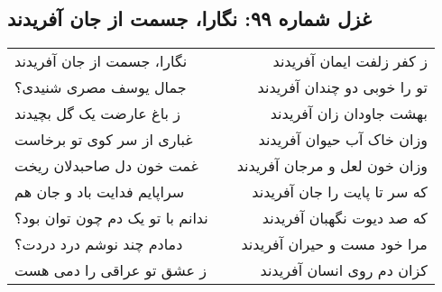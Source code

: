 \begin{center}
\section*{غزل شماره ۹۹: نگارا، جسمت از جان آفریدند}
\label{sec:099}
\begin{longtable}{l p{0.5cm} r}
نگارا، جسمت از جان آفریدند
&&
ز کفر زلفت ایمان آفریدند
\\
جمال یوسف مصری شنیدی؟
&&
تو را خوبی دو چندان آفریدند
\\
ز باغ عارضت یک گل بچیدند
&&
بهشت جاودان زان آفریدند
\\
غباری از سر کوی تو برخاست
&&
وزان خاک آب حیوان آفریدند
\\
غمت خون دل صاحبدلان ریخت
&&
وزان خون لعل و مرجان آفریدند
\\
سراپایم فدایت باد و جان هم
&&
که سر تا پایت را جان آفریدند
\\
ندانم با تو یک دم چون توان بود؟
&&
که صد دیوت نگهبان آفریدند
\\
دمادم چند نوشم درد دردت؟
&&
مرا خود مست و حیران آفریدند
\\
ز عشق تو عراقی را دمی هست
&&
کزان دم روی انسان آفریدند
\\
\end{longtable}
\end{center}
